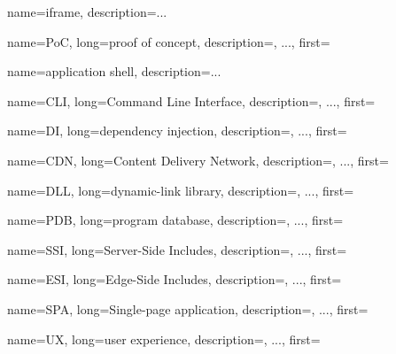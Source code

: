 {
    name=iframe,
    description={...}%
}

{
    name=PoC,
    long={proof of concept},
    description={, ...},%
    first=
}

{
    name={application shell},
    description={...}%
}


{
    name=CLI,
    long={Command Line Interface},
    description={, ...},%
    first=
}

{
    name=DI,
    long={dependency injection},
    description={, ...},%
    first=
}

{
    name=CDN,
    long={Content Delivery Network},
    description={, ...},%
    first=
}

{
    name=DLL,
    long={dynamic-link library},
    description={, ...},%
    first=
}

{
    name=PDB,
    long={program database},
    description={, ...},%
    first=
}

{
    name=SSI,
    long={Server-Side Includes},
    description={, ...},%
    first=
}

{
    name=ESI,
    long={Edge-Side Includes},
    description={, ...},%
    first=
}

{
    name=SPA,
    long={Single-page application},
    description={, ...},%
    first=
}

{
    name=UX,
    long={user experience},
    description={, ...},%
    first=
}
